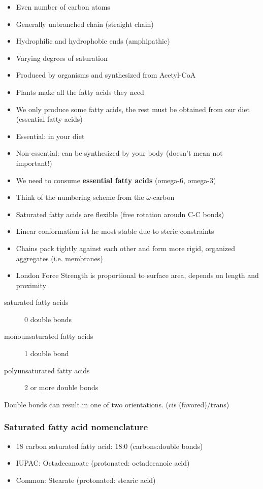 \documentclass[letterpaper, 12pt]{article}
\begin{document}
\begin{itemize}
\item Even number of carbon atoms
\item Generally unbranched chain (straight chain)
\item Hydrophilic and hydrophobic ends (amphipathic)
\item Varying degrees of saturation
\item Produced by organisms and synthesized from Acetyl-CoA
\item Plants make all the fatty acids they need
\item We only produce some fatty acids, the rest must be obtained from our diet (essential fatty acids)
\item Essential: in your diet
\item Non-essential: can be synthesized by your body (doesn't mean not important!)
\item We need to consume \textbf{essential fatty acids} (omega-6, omega-3)
\item Think of the numbering scheme from the $\omega$-carbon
\item Saturated fatty acids are flexible (free rotation aroudn C-C bonds)
\item Linear conformation ist he most stable due to steric constraints
\item Chains pack tightly against each other and form more rigid, organized aggregates (i.e. membranes)
\item London Force Strength is proportional to surface area, depends on length and proximity
\end{itemize}

\begin{description}
\item [saturated fatty acids] 0 double bonds
\item [monounsaturated fatty acids] 1 double bond
\item [polyunsaturated fatty acids] 2 or more double bonds
\end{description}

Double bonds can result in one of two orientations. (cis (favored)/trans)

\subsubsection*{Saturated fatty acid nomenclature} 

\begin{itemize}
\item 18 carbon saturated fatty acid: 18:0 (carbons:double bonds)
\item IUPAC: Octadecanoate (protonated: octadecanoic acid)
\item Common: Stearate (protonated: stearic acid)
\end{itemize}
\end{document}
